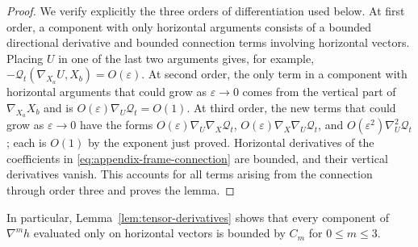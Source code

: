 \documentclass[11pt]{article}
\theoremstyle{definition}
\theoremstyle{remark}
\newcommand{\eps}{\varepsilon}
\begin{document}
\begin{proof}
We verify explicitly the three orders of differentiation used below.  At first order, a
component with only horizontal arguments consists of a bounded directional
derivative and bounded connection terms involving horizontal vectors.  Placing
$U$ in one of the last two arguments gives, for
example, $-\mathcal Q_t(\nabla_{X_a}U,X_b)=O(\eps)$.  At second order, the
only term in a component with horizontal arguments that could grow as
$\eps\to0$ comes from the vertical part of $\nabla_{X_a}X_b$ and is
$O(\eps)\nabla_U\mathcal Q_t=O(1)$.  At third order, the new terms that could
grow as $\eps\to0$ have the forms
$O(\eps)\nabla_U\nabla_X\mathcal Q_t$,
$O(\eps)\nabla_X\nabla_U\mathcal Q_t$, and
$O(\eps^2)\nabla_U^2\mathcal Q_t$; each is $O(1)$ by the exponent just
proved.  Horizontal derivatives of the coefficients in
\eqref{eq:appendix-frame-connection} are bounded, and their vertical
derivatives vanish.  This accounts for all terms arising from the connection
through order three and proves the lemma.
\end{proof}

In particular, Lemma~\ref{lem:tensor-derivatives} shows that every component of
$\nabla^m h$ evaluated only on horizontal vectors is bounded by $C_m$ for
$0\leq m\leq3$.
\end{document}
